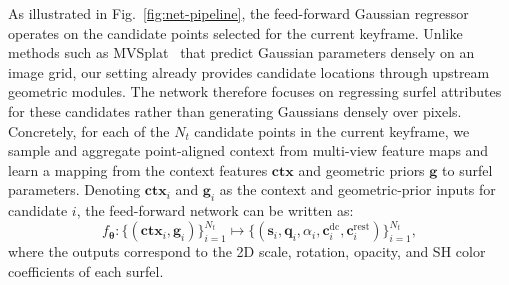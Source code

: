 \documentclass[letterpaper,journal]{IEEEtran}
\begin{document}
As illustrated in Fig.~\ref{fig:net-pipeline}, the feed-forward Gaussian regressor operates on the candidate points selected for the current keyframe. Unlike methods such as MVSplat~\cite{chen2024mvsplat} that predict Gaussian parameters densely on an image grid, our setting already provides candidate locations through upstream geometric modules. The network therefore focuses on regressing surfel attributes for these candidates rather than generating Gaussians densely over pixels. Concretely, for each of the $N_t$ candidate points in the current keyframe, we sample and aggregate point-aligned context from multi-view feature maps and learn a mapping from the context features $\mathbf{ctx}$ and geometric priors $\mathbf{g}$ to surfel parameters. Denoting $\mathbf{ctx}_i$ and $\mathbf{g}_i$ as the context and geometric-prior inputs for candidate $i$, the feed-forward network can be written as:
%
\begin{equation}
f_{\boldsymbol{\theta}} : \{(\mathbf{ctx}_i, \mathbf{g}_i)\}_{i=1}^{N_t}
\mapsto
\{(\mathbf{s}_i, \mathbf{q}_i, \alpha_i, \mathbf{c}_i^{\mathrm{dc}}, \mathbf{c}_i^{\mathrm{rest}})\}_{i=1}^{N_t},
\end{equation}
%
where the outputs correspond to the 2D scale, rotation, opacity, and SH color coefficients of each surfel.
\end{document}

